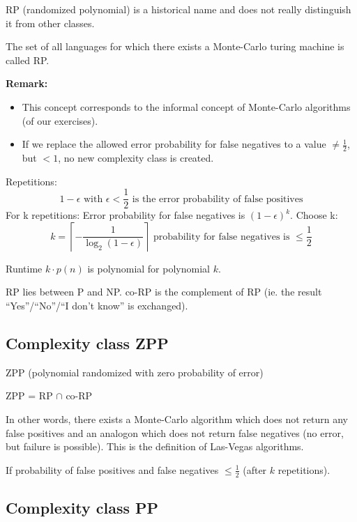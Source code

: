 \documentclass[a4paper]{article}
\newcommand{\cls}[1]{\rm{#1}}
\begin{document}
\cls{RP} (randomized polynomial) is a historical name and does not really distinguish
it from other classes.

The set of all languages for which there exists a Monte-Carlo turing machine
is called \cls{RP}.

\textbf{Remark:}
\begin{itemize}
  \item This concept corresponds to the informal concept of Monte-Carlo algorithms (of our exercises).
  \item If we replace the allowed error probability for false negatives to a value $\neq \frac12$, but $< 1$, no new complexity class is created.
\end{itemize}

Repetitions:
\[
    1-\epsilon \text{ with } \epsilon < \frac12 \text{ is the error probability of false positives}
\]
For k repetitions: Error probability for false negatives is $(1 - \epsilon)^k$. Choose k:
\[
    k = \left\lceil - \frac{1}{\log_2(1-\epsilon)} \right\rceil
        \text{  probability for false negatives is } \leq \frac12
\]

Runtime $k\cdot p(n)$ is polynomial for polynomial $k$.

\cls{RP} lies between \cls{P} and \cls{NP}. \cls{co-\cls{RP}} is the complement of \cls{RP} (ie. the result ``Yes''/``No''/``I don't know'' is exchanged).

\subsection{Complexity class \cls{ZPP}}
\label{class:ZPP}
\label{class:rp}
\label{class:co-rp}

\cls{ZPP} (polynomial randomized with zero probability of error)

\centerline{\cls{ZPP} = \cls{RP} $\cap$ \cls{co-\cls{RP}}}

In other words, there exists a Monte-Carlo algorithm which does not return
any false positives and an analogon which does not return false negatives
(no error, but failure is possible). This is the definition of Las-Vegas algorithms.

If probability of false positives and false negatives $\leq \frac12$ (after $k$ repetitions).

\subsection{Complexity class \cls{PP}}
\label{class:pp}
\end{document}
